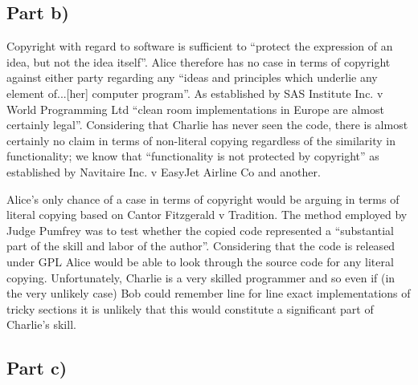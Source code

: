 \documentclass[a4paper, 6pt]{article}
\begin{document}
\subsection{Part b)}
Copyright with regard to software is sufficient to ``protect the expression of an idea, but not the idea itself''.
 Alice therefore has no case in terms of copyright against either party regarding any ``ideas and principles which underlie any element of...[her] computer program''.
 As established by SAS Institute Inc. v World Programming Ltd ``clean room implementations in Europe are almost certainly legal''.
 Considering that Charlie has never seen the code, there is almost certainly no claim in terms of non-literal copying regardless of the similarity in functionality;
 we know that ``functionality is not protected by copyright'' as established by Navitaire Inc. v EasyJet Airline Co and another.

 Alice's only chance of a case in terms of copyright would be arguing in terms of literal copying based on Cantor Fitzgerald v Tradition.
 The method employed by Judge Pumfrey was to test whether the copied code represented a ``substantial part of the skill and labor of the author''.
 Considering that the code is released under GPL Alice would be able to look through the source code for any literal copying. Unfortunately, Charlie is a very skilled 
 programmer and so even if (in the very unlikely case) Bob could remember line for line exact implementations of tricky sections it is unlikely that this would constitute
 a significant part of Charlie's skill. 

\subsection{Part c)}
\end{document}
